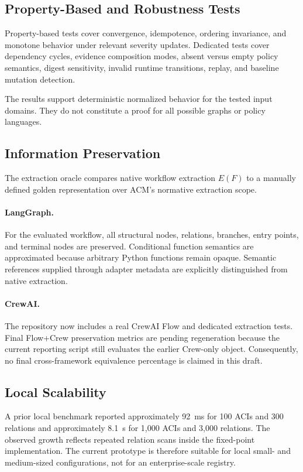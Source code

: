 \documentclass[10pt]{article}
\begin{document}
\subsection{Property-Based and Robustness Tests}

Property-based tests cover convergence, idempotence, ordering invariance, and monotone behavior under relevant severity updates. Dedicated tests cover dependency cycles, evidence composition modes, absent versus empty policy semantics, digest sensitivity, invalid runtime transitions, replay, and baseline mutation detection.

The results support deterministic normalized behavior for the tested input domains. They do not constitute a proof for all possible graphs or policy languages.

\subsection{Information Preservation}

The extraction oracle compares native workflow extraction $E(F)$ to a manually defined golden representation over ACM's normative extraction scope.

\paragraph{LangGraph.}
For the evaluated workflow, all structural nodes, relations, branches, entry points, and terminal nodes are preserved. Conditional function semantics are approximated because arbitrary Python functions remain opaque. Semantic references supplied through adapter metadata are explicitly distinguished from native extraction.

\paragraph{CrewAI.}
The repository now includes a real CrewAI Flow and dedicated extraction tests. Final Flow+Crew preservation metrics are pending regeneration because the current reporting script still evaluates the earlier Crew-only object. Consequently, no final cross-framework equivalence percentage is claimed in this draft.

\subsection{Local Scalability}

A prior local benchmark reported approximately 92~ms for 100 ACIs and 300 relations and approximately 8.1~s for 1,000 ACIs and 3,000 relations. The observed growth reflects repeated relation scans inside the fixed-point implementation. The current prototype is therefore suitable for local small- and medium-sized configurations, not for an enterprise-scale registry.
\end{document}
